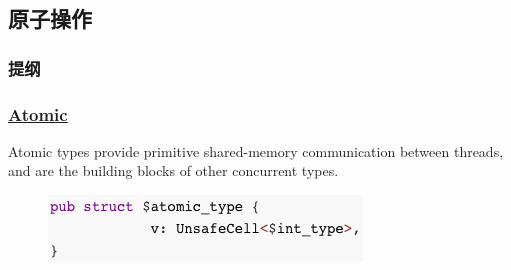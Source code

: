 \subsection{原子操作} %
\begin{frame}
\frametitle{提纲} %
\tableofcontents %
\end{frame}
\begin{frame}[fragile]
    \frametitle{\href{https://doc.rust-lang.org/core/sync/atomic/index.html}{Atomic}}

Atomic types provide primitive shared-memory communication between threads, and are the building blocks of other concurrent types.

    \begin{figure}
    \includegraphics[width=0.5\linewidth]{figs/struct-atomic.png}
    \end{figure}

\end{frame}
% 
% 
% 
% 
% 
